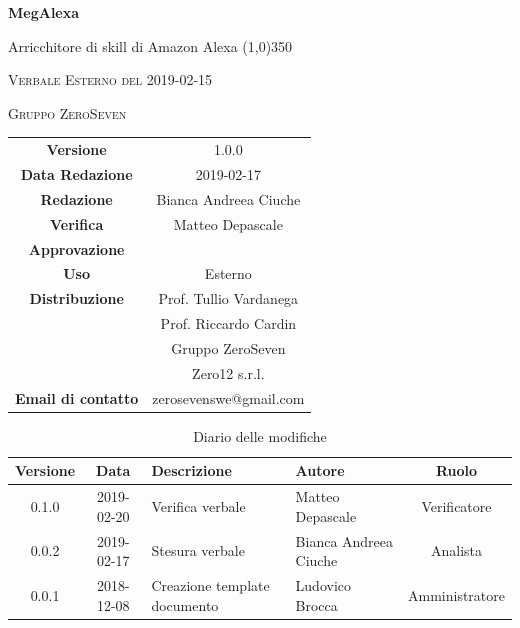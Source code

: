\documentclass[a4paper,12pt]{article}
\author{Bianca Andreea Ciuche}
\date{2019-02-15}
\begin{document}
	\begin{titlepage}
		\centering
		{\huge\bfseries MegAlexa\par}
		Arricchitore di skill di Amazon Alexa
		\line(1,0){350} \\
		{\scshape\LARGE Verbale Esterno del 2019-02-15 \par}
		\vspace{1cm}
		{\scshape Gruppo ZeroSeven \par}
		\logo
		\begin{tabular}{c|c}
			{\hfill \textbf{Versione}} 			& 1.0.0				\\
			{\hfill\textbf{Data Redazione}} 	& 2019-02-17		\\ 
			{\hfill\textbf{Redazione}} 			&  		Bianca Andreea Ciuche		\\ 
			{\hfill\textbf{Verifica}} 				&  	Matteo Depascale  	\\ 
			{\hfill\textbf{Approvazione}} 		&  		\\ 
			{\hfill\textbf{Uso}} 					& 	Esterno	\\ 
			{\hfill\textbf{Distribuzione}} 			& 			Prof. Tullio Vardanega \\ & Prof. Riccardo Cardin \\ & Gruppo ZeroSeven \\ & Zero12 s.r.l.	\\ 
			{\hfill\textbf{Email di contatto}} & zerosevenswe@gmail.com \\
		\end{tabular}
	\end{titlepage}
	
	
	
	\label{LastFrontPage}
	
	
	\newpage
	\cleardoublepage
	\begin{table}[tbph]
		\centering
		\begin{tabularx}{\textwidth}{|c|c|X|X|c|}
			\hline
			\textbf{Versione} & \textbf{Data} & \textbf{Descrizione} & \textbf{Autore} & \textbf{Ruolo} \\
			\hline
			0.1.0 & 2019-02-20 & Verifica verbale & Matteo Depascale & Verificatore \\
			\hline
			0.0.2 & 2019-02-17 & Stesura verbale &Bianca Andreea Ciuche  & Analista \\
			\hline
			0.0.1 & 2018-12-08 & Creazione template documento & Ludovico Brocca & Amministratore\\
			\hline
		\end{tabularx}
		\caption{Diario delle modifiche}
	\end{table}
	\cleardoublepage
	\pagestyle{mymain}
	
\end{document}
